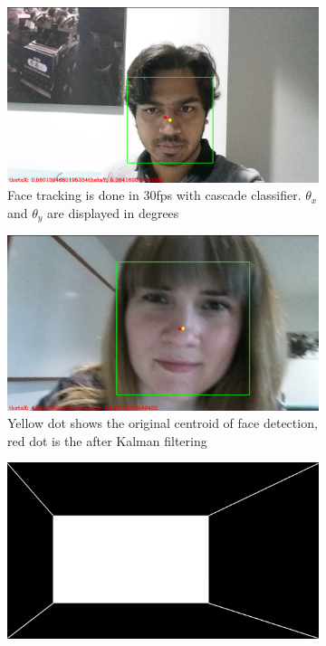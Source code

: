 \documentclass[12pt,twocolumn,letterpaper]{article}
\begin{document}
\begin{figure}
\begin{subfigure}{0.5\textwidth}
\includegraphics[scale=0.09]{images/jai}
\caption{Face tracking is done in 30fps with cascade classifier. $\theta_x$ and $\theta_y$ are displayed in degrees}
\end{subfigure}
\begin{subfigure}{0.5\textwidth}
\includegraphics[scale=0.09]{images/jenna2}
\caption{Yellow dot shows the original centroid of face detection, red dot is the after Kalman filtering}
\end{subfigure}
\begin{subfigure}{0.5\textwidth}
\includegraphics[scale=0.09]{images/3dperspective_user_left}

\end{subfigure}
\end{figure}
\end{document}
